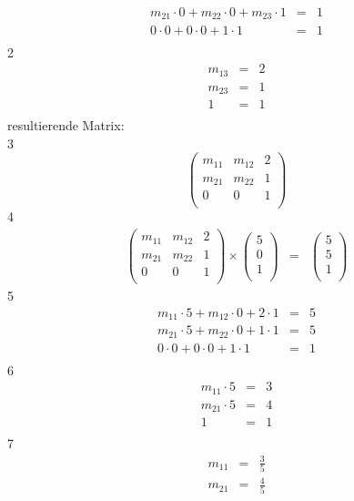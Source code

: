 \documentclass[11pt]{article}
\begin{document}
\begin{enumerate}
\begin{eqnarray*}
m_{21} \cdot 0 + m_{22} \cdot 0 + m_{23} \cdot 1  &=& 1 \\
0 \cdot 0 + 0 \cdot 0 + 1 \cdot 1 &=& 1 \\ 
\end{eqnarray*}
2
\begin{eqnarray*}
m_{13} &=& 2 \\
m_{23} &=& 1 \\
1 &=& 1 \\
\end{eqnarray*}
resultierende Matrix:\\
3
$$\begin{pmatrix}
m_{11} & m_{12} & 2 \\
m_{21} & m_{22} & 1 \\
0 & 0 & 1 \\
\end{pmatrix}$$
4
\begin{eqnarray*}
\begin{pmatrix}
m_{11} & m_{12} & 2 \\
m_{21} & m_{22} & 1 \\
0 & 0 & 1 \\
\end{pmatrix}
\times
\begin{pmatrix}
5 \\ 0 \\ 1 \\
\end{pmatrix}
&=&
\begin{pmatrix}
5 \\ 5 \\ 1 \\
\end{pmatrix}
\end{eqnarray*}
5
\begin{eqnarray*}
m_{11} \cdot 5 + m_{12} \cdot 0 + 2 \cdot 1  &=& 5 \\
m_{21} \cdot 5 + m_{22} \cdot 0 + 1 \cdot 1 &=& 5 \\
0 \cdot 0 + 0 \cdot 0 + 1 \cdot 1 &=& 1 \\ 
\end{eqnarray*}
6
\begin{eqnarray*}
m_{11} \cdot 5 &=& 3 \\
m_{21} \cdot 5 &=& 4 \\
1 &=& 1 \\ 
\end{eqnarray*}
7
\begin{eqnarray*}
m_{11} &=& \frac{3}{5} \\
m_{21} &=& \frac{4}{5} \\

\end{eqnarray*}
\end{enumerate}
\end{document}
